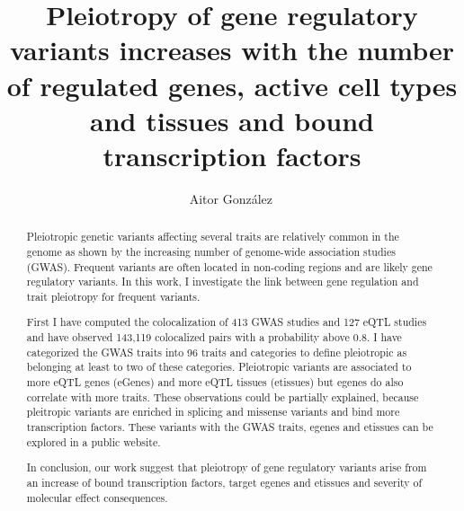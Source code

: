 
\title{Pleiotropy of gene regulatory variants increases with the number of regulated genes, active cell types and tissues and bound transcription factors}

\author[1,*]{Aitor González\,}

\date{}

\maketitle

\begin{abstract}

Pleiotropic genetic variants affecting several traits are relatively common in the genome as shown by the increasing number of genome-wide association studies (GWAS).
%
Frequent variants are often located in non-coding regions and are likely gene regulatory variants.
%
In this work, I investigate the link between gene regulation and trait pleiotropy for frequent variants.

First I have computed the colocalization of 413 GWAS studies and 127 eQTL studies and have observed 143,119 colocalized pairs with a probability above 0.8.
%
I have categorized the GWAS traits into 96 traits and categories to define pleiotropic as belonging at least to two of these categories.
%
Pleiotropic variants are associated to more eQTL genes (eGenes) and more eQTL tissues (etissues) but egenes do also correlate with more traits.
%
These observations could be partially explained, because pleitropic variants are enriched in splicing and missense variants and bind more transcription factors.
%
These variants with the GWAS traits, egenes and etissues can be explored in a public website.

In conclusion, our work suggest that pleiotropy of gene regulatory variants arise from an increase of bound transcription factors, target egenes and etissues and severity of molecular effect consequences.

\end{abstract}



